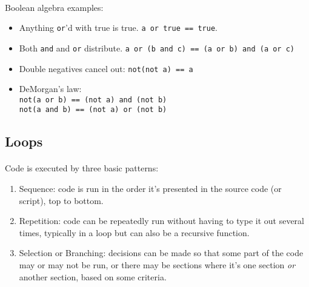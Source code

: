\documentclass[letter,10pt]{article}
\begin{document}
\paragraph{}Boolean algebra examples:
\begin{itemize}
    \item Anything \verb|or|'d with true is true. \verb|a or true == true|.
    \item Both \verb|and| and \verb|or| distribute. \verb|a or (b and c) == (a or b) and (a or c)|
    \item Double negatives cancel out: \verb|not(not a) == a|
    \item DeMorgan's law: \\
        \verb|not(a or b) == (not a) and (not b)| \\
        \verb|not(a and b) == (not a) or (not b)|
\end{itemize}

\subsection{Loops}
\paragraph{}Code is executed by three basic patterns:
\begin{enumerate}
    \item Sequence: code is run in the order it's presented in the source code (or script), top to bottom.
    \item Repetition: code can be repeatedly run without having to type it out several times, typically in a loop but can also be a recursive function.
    \item Selection or Branching: decisions can be made so that some part of the code may or may not be run, or there may be sections where it's one section \textit{or} another section, based on some criteria.
\end{enumerate}
\end{document}
